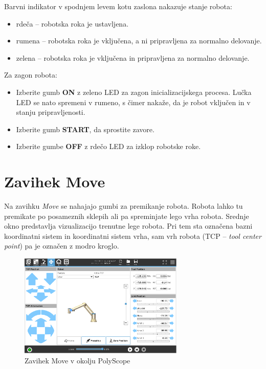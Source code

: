 Barvni indikator v spodnjem levem kotu zaslona nakazuje stanje robota:
\begin{itemize}
\item rdeča -- robotska roka je ustavljena.
\item rumena -- robotska roka je vključena, a ni pripravljena za normalno delovanje.
\item zelena -- robotska roka je vključena in pripravljena za normalno delovanje.
\end{itemize}

Za zagon robota:
\begin{itemize}
    \item Izberite gumb \textbf{ON} z zeleno LED za zagon inicializacijskega procesa. Lučka LED se nato spremeni v rumeno, s čimer nakaže, da je robot vključen in v stanju pripravljenosti.
    \item Izberite gumb \textbf{START}, da sprostite zavore.
    \item Izberite gumbe \textbf{OFF} z rdečo LED za izklop robotske roke.
\end{itemize}



\section{Zavihek Move}

Na zavihku \emph{Move} se nahajajo gumbi za premikanje robota. Robota lahko tu premikate po posameznih sklepih ali pa spreminjate lego vrha robota. Srednje okno predstavlja vizualizacijo trenutne lege robota. Pri tem sta označena bazni koordinatni sistem in koordinatni sistem vrha, sam vrh robota (TCP -- \emph{tool center point}) pa je označen z modro kroglo.

\begin{figure}[!hbt]
\centering
\includegraphics[width=0.7\textwidth]{ur5e_tab2.eps}
\caption{Zavihek Move v okolju PolyScope}
\label{fig:ur_tab2}
\end{figure}

